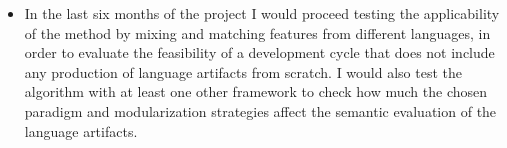 \begin{itemize}
    \item In the last six months of the project I would proceed testing the applicability of the method by mixing and matching features from different languages, in order to evaluate the feasibility of a development cycle that does not include any production of language artifacts from scratch. I would also test the algorithm with at least one other framework to check how much the chosen paradigm and modularization strategies affect the semantic evaluation of the language artifacts.
\end{itemize}
